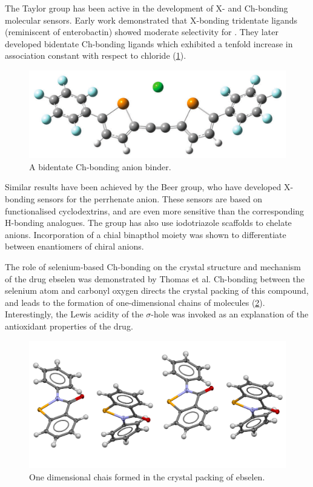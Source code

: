 \begin{refsection}
The Taylor group has been active in the development of X- and Ch-bonding molecular sensors.
Early work demonstrated that X-bonding tridentate ligands (reminiscent of enterobactin) showed moderate selectivity for .\autocite{Dimitrijevic2010}
They later developed bidentate Ch-bonding ligands which exhibited a tenfold increase in association constant with respect to chloride (\cref{fig:taylor-cl-binder}).\autocite{Garrett2015a,Garrett2016}

\begin{figure}
    \centering
    \includegraphics[width=0.6\linewidth]{Figures/taylor-cl-binder.pdf}
    \caption{A bidentate Ch-bonding anion binder.\autocite{Garrett2016}}
    \label{fig:taylor-cl-binder}
\end{figure}

Similar results have been achieved by the Beer group, who have developed X-bonding sensors for the perrhenate anion.\autocite{Cornes2017}
These sensors are based on functionalised cyclodextrins, and are even more sensitive than the corresponding H-bonding analogues.
The group has also use iodotriazole scaffolds to chelate anions.\autocite{Borissov2017}
Incorporation of a chial binapthol moiety was shown to differentiate between enantiomers of chiral anions.

The role of selenium-based Ch-bonding on the crystal structure and mechanism of the drug ebselen was demonstrated by Thomas et al.\autocite{Thomas2015}
Ch-bonding between the selenium atom and carbonyl oxygen directs the crystal packing of this compound, and leads to the formation of one-dimensional chains of molecules (\cref{fig:ebs-packing}).
Interestingly, the Lewis acidity of the $\sigma$-hole was invoked as an explanation of the antioxidant properties of the drug.

\begin{figure}
    \centering
    \includegraphics[width=0.7\linewidth]{Figures/ebs-packing.pdf}
    \caption{One dimensional chais formed in the crystal packing of ebselen.}
    \label{fig:ebs-packing}
\end{figure}


\end{refsection}
